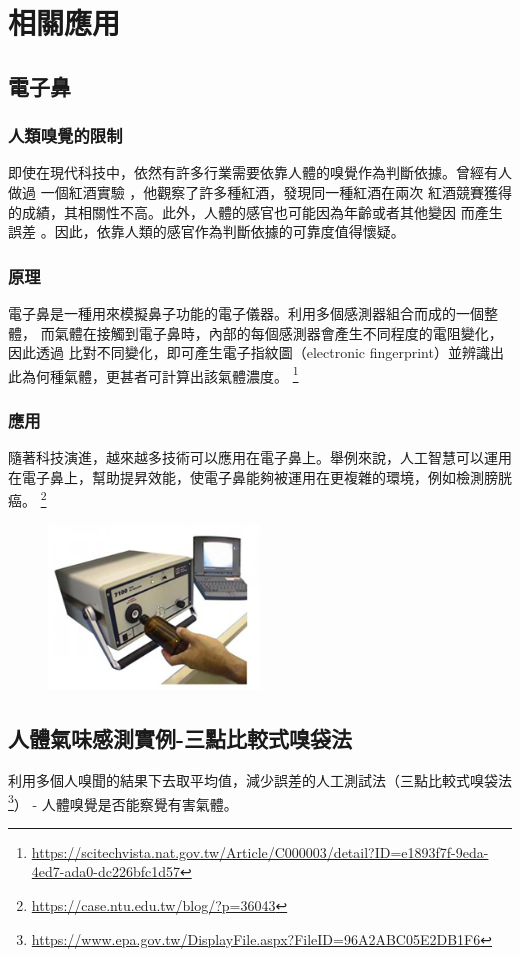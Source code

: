 \chapter{相關應用}

\section{電子鼻}
\subsection{人類嗅覺的限制}
即使在現代科技中，依然有許多行業需要依靠人體的嗅覺作為判斷依據。曾經有人做過
一個紅酒實驗 \cite{hodgson_2008} ，他觀察了許多種紅酒，發現同一種紅酒在兩次
紅酒競賽獲得的成績，其相關性不高。此外，人體的感官也可能因為年齡或者其他變因
而產生誤差 \cite{Hugh2015} 。因此，依靠人類的感官作為判斷依據的可靠度值得懷疑。
\subsection{原理}
電子鼻是一種用來模擬鼻子功能的電子儀器。利用多個感測器組合而成的一個整體，
而氣體在接觸到電子鼻時，內部的每個感測器會產生不同程度的電阻變化，因此透過
比對不同變化，即可產生電子指紋圖（electronic fingerprint）並辨識出
此為何種氣體，更甚者可計算出該氣體濃度。 \footnote{\url{https://scitechvista.nat.gov.tw/Article/C000003/detail?ID=e1893f7f-9eda-4ed7-ada0-dc226bfc1d57}}
\subsection{應用}
隨著科技演進，越來越多技術可以應用在電子鼻上。舉例來說，人工智慧可以運用
在電子鼻上，幫助提昇效能，使電子鼻能夠被運用在更複雜的環境，例如檢測膀胱癌。 \footnote{\url{https://case.ntu.edu.tw/blog/?p=36043}}
\begin{figure}[H]
	\centering
	\includegraphics[width=0.5\textwidth]{pic/nose.png}
\end{figure}

\section{人體氣味感測實例-三點比較式嗅袋法}
利用多個人嗅聞的結果下去取平均值，減少誤差的人工測試法（三點比較式嗅袋法\footnote{\url{https://www.epa.gov.tw/DisplayFile.aspx?FileID=96A2ABC05E2DB1F6}}）
- 人體嗅覺是否能察覺有害氣體。
